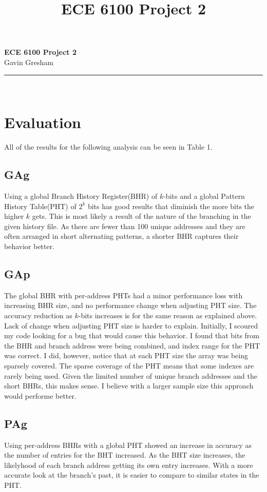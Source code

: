 \documentclass[letterpaper,11pt]{article}
\title{ECE 6100 Project 2}
\begin{document}
\begin{center}
\textbf{ECE 6100 Project 2}\\
Gavin Gresham\\
\rule{3in}{1pt}\\
\end{center}

\section{Evaluation}
All of the results for the following analysis can be seen in Table 1.
\subsection{GAg}
Using a global Branch History Register(BHR) of $k$-bits and a global Pattern History Table(PHT) of $2^k$ bits has good results that diminish the more bits the higher $k$ gets. This is most likely a result of the nature of the branching in the given history file. As there are fewer than 100 unique addresses and they are often arranged in short alternating patterns, a shorter BHR captures their behavior better.
\subsection{GAp}
The global BHR with per-address PHTs had a minor performance loss with increasing BHR size, and no performance change when adjusting PHT size. The accuracy reduction as $k$-bits increases is for the same reason as explained above. Lack of change when adjusting PHT size is harder to explain.
Initially, I scoured my code looking for a bug that would cause this behavior. I found that bits from the BHR and branch address were being combined, and index range for the PHT was correct. I did, however, notice that at each PHT size the array was being sparsely covered.
The sparse coverage of the PHT means that some indexes are rarely being used. Given the limited number of unique branch addresses and the short BHRs, this makes sense. I believe with a larger sample size this approach would performe better.
\subsection{PAg}
Using per-address BHRs with a global PHT showed an increase in accuracy as the number of entries for the BHT increased. As the BHT size increases, the likelyhood of each branch address getting its own entry increases. With a more accurate look at the branch's past, it is easier to compare to similar states in the PHT.
\end{document}
